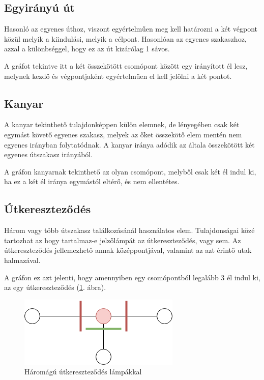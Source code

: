 \subsection{Egyirányú út}

Hasonló az egyenes úthoz, viszont egyértelműen meg kell határozni a két végpont közül melyik a kiindulási, melyik a célpont. Hasonlóan az egyenes szakaszhoz, azzal a különbséggel, hogy ez az út kizárólag 1 sávos.

A gráfot tekintve itt a két összekötött csomópont között egy irányított él lesz, melynek kezdő és végpontjaként egyértelműen el kell jelölni a két pontot.

\subsection{Kanyar}

A kanyar tekinthető tulajdonképpen külön elemnek, de lényegében csak két egymást követő egyenes szakasz, melyek az őket összekötő elem mentén nem egyenes irányban folytatódnak. A kanyar iránya adódik az általa összekötött két egyenes útszakasz irányából.

A gráfon kanyarnak tekinthető az olyan csomópont, melyből csak két él indul ki, ha ez a két él iránya egymástól eltérő, és nem ellentétes.

\subsection{Útkereszteződés}

Három vagy több útszakasz találkozásánál használatos elem. Tulajdonságai közé tartozhat az hogy tartalmaz-e jelzőlámpát az útkereszteződés, vagy sem.
Az útkereszteződés jellemezhető annak középpontjával, valamint az azt érintő utak halmazával.

A gráfon ez azt jelenti, hogy amennyiben egy csomópontból legalább 3 él indul ki, az egy útkereszteződés (\ref{fig:xroad}. ábra).

\begin{figure}[H]
\includegraphics[width=\linewidth]{utkereszt.png}
\caption{Háromágú útkereszteződés lámpákkal}
\label{fig:xroad}
\end{figure}

